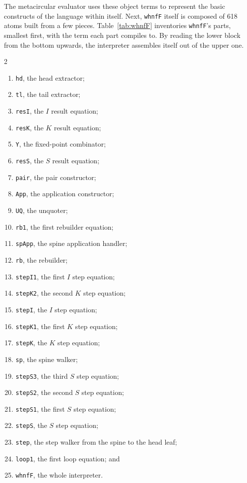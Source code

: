 \documentclass[english,submission,code=tt]{programming}
\begin{document}
The metacircular evaluator uses these object terms to represent the 
basic constructs of the language within itself.  Next, \texttt{whnfF}
itself is composed of 618 atoms built from a few pieces.
Table~\ref{tab:whnfF} inventories \texttt{whnfF}'s parts, smallest 
first, with the term each part compiles to.  By reading the lower block 
from the bottom upwards, the interpreter assembles itself out of the 
upper one.
\begin{multicols}{2}
\begin{enumerate}[nosep]
  \item \texttt{hd}, the head extractor;
  \item \texttt{tl}, the tail extractor;
  \item \texttt{resI}, the $I$ result equation;
  \item \texttt{resK}, the $K$ result equation;
  \item \texttt{Y}, the fixed-point combinator;
  \item \texttt{resS}, the $S$ result equation;
  \item \texttt{pair}, the pair constructor;
  \item \texttt{App}, the application constructor;
  \item \texttt{UQ}, the unquoter;
  \item \texttt{rb1}, the first rebuilder equation;
  \item \texttt{spApp}, the spine application handler;
  \item \texttt{rb}, the rebuilder;
  \item \texttt{stepI1}, the first $I$ step equation;
  \item \texttt{stepK2}, the second $K$ step equation;
  \item \texttt{stepI}, the $I$ step equation;
  \item \texttt{stepK1}, the first $K$ step equation;
  \item \texttt{stepK}, the $K$ step equation;
  \item \texttt{sp}, the spine walker;
  \item \texttt{stepS3}, the third $S$ step equation;
  \item \texttt{stepS2}, the second $S$ step equation;
  \item \texttt{stepS1}, the first $S$ step equation;
  \item \texttt{stepS}, the $S$ step equation;
  \item \texttt{step}, the step walker from the spine to the head leaf;
  \item \texttt{loop1}, the first loop equation; and
  \item \texttt{whnfF}, the whole interpreter.
\end{enumerate}
\end{multicols}
\end{document}
